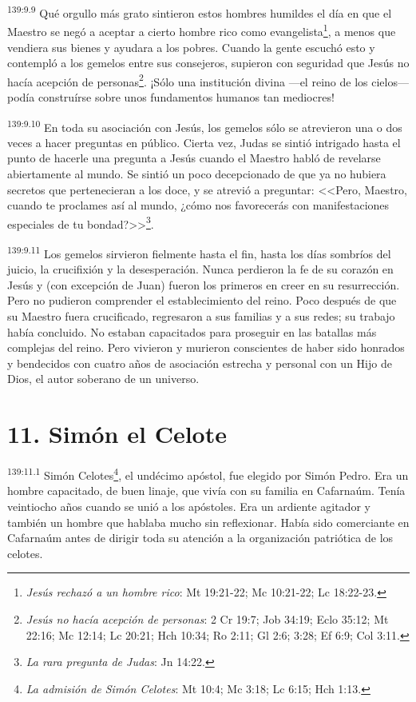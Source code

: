 \par 
\textsuperscript{139:9.9} Qué orgullo más grato sintieron estos hombres humildes el día en que el Maestro se negó a aceptar a cierto hombre rico como evangelista\footnote{\textit{Jesús rechazó a un hombre rico}: Mt 19:21-22; Mc 10:21-22; Lc 18:22-23.}, a menos que vendiera sus bienes y ayudara a los pobres. Cuando la gente escuchó esto y contempló a los gemelos entre sus consejeros, supieron con seguridad que Jesús no hacía acepción de personas\footnote{\textit{Jesús no hacía acepción de personas}: 2 Cr 19:7; Job 34:19; Eclo 35:12; Mt 22:16; Mc 12:14; Lc 20:21; Hch 10:34; Ro 2:11; Gl 2:6; 3:28; Ef 6:9; Col 3:11.}. ¡Sólo una institución divina ---el reino de los cielos--- podía construírse sobre unos fundamentos humanos tan mediocres!

\par 
\textsuperscript{139:9.10} En toda su asociación con Jesús, los gemelos sólo se atrevieron una o dos veces a hacer preguntas en público. Cierta vez, Judas se sintió intrigado hasta el punto de hacerle una pregunta a Jesús cuando el Maestro habló de revelarse abiertamente al mundo. Se sintió un poco decepcionado de que ya no hubiera secretos que pertenecieran a los doce, y se atrevió a preguntar: <<Pero, Maestro, cuando te proclames así al mundo, ¿cómo nos favorecerás con manifestaciones especiales de tu bondad?>>\footnote{\textit{La rara pregunta de Judas}: Jn 14:22.}.

\par 
\textsuperscript{139:9.11} Los gemelos sirvieron fielmente hasta el fin, hasta los días sombríos del juicio, la crucifixión y la desesperación. Nunca perdieron la fe de su corazón en Jesús y (con excepción de Juan) fueron los primeros en creer en su resurrección. Pero no pudieron comprender el establecimiento del reino. Poco después de que su Maestro fuera crucificado, regresaron a sus familias y a sus redes; su trabajo había concluido. No estaban capacitados para proseguir en las batallas más complejas del reino. Pero vivieron y murieron conscientes de haber sido honrados y bendecidos con cuatro años de asociación estrecha y personal con un Hijo de Dios, el autor soberano de un universo.

\section*{11. Simón el Celote}
\par 
\textsuperscript{139:11.1} Simón Celotes\footnote{\textit{La admisión de Simón Celotes}: Mt 10:4; Mc 3:18; Lc 6:15; Hch 1:13.}, el undécimo apóstol, fue elegido por Simón Pedro. Era un hombre capacitado, de buen linaje, que vivía con su familia en Cafarnaúm. Tenía veintiocho años cuando se unió a los apóstoles. Era un ardiente agitador y también un hombre que hablaba mucho sin reflexionar. Había sido comerciante en Cafarnaúm antes de dirigir toda su atención a la organización patriótica de los celotes.

